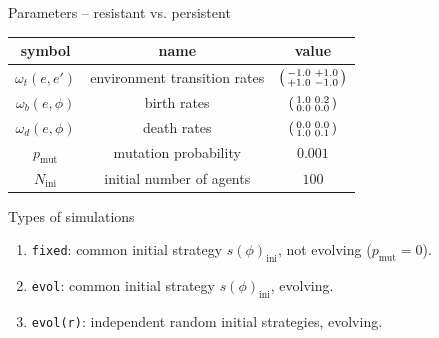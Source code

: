 \documentclass{beamer}
\begin{document}
\begin{frame}
  \begin{block}{Parameters -- resistant vs. persistent}
    \begin{table}
      \begin{tabular}{c c c}
        \toprule
        symbol             & name                         & value                                                        \\
        \midrule
        $\omega_t(e,e')$   & environment transition rates & $\begin{psmallmatrix}-1.0&+1.0\\+1.0&-1.0\end{psmallmatrix}$ \\
        \addlinespace
        $\omega_b(e,\phi)$ & birth rates                  & $\begin{psmallmatrix}1.0&0.2\\0.0&0.0\end{psmallmatrix}$     \\
        \addlinespace
        $\omega_d(e,\phi)$ & death rates                  & $\begin{psmallmatrix}0.0&0.0\\1.0&0.1\end{psmallmatrix}$     \\
        \addlinespace
        $p_{\text{mut}}$   & mutation probability         & $0.001$                                                      \\
        \addlinespace
        $N_{\text{ini}}$   & initial number of agents     & $100$                                                        \\
        \bottomrule
      \end{tabular}
    \end{table}
  \end{block}

  \begin{block}{Types of simulations}
    \begin{enumerate}
      \item \alert{\texttt{fixed}}: \alert{common} initial strategy $s(\phi)_{\text{ini}}$, \alert{not evolving} ($p_{\text{mut}}=0$).
      \item \alert{\texttt{evol}}: \alert{common} initial strategy $s(\phi)_{\text{ini}}$, \alert{evolving}.
      \item \alert{\texttt{evol(r)}}: \alert{independent random} initial strategies, \alert{evolving}.
    \end{enumerate}
  \end{block}


\end{frame}
\end{document}
